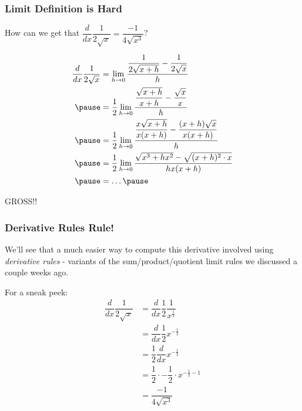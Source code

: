 \documentclass{ltx-talk}
\begin{document}
\begin{frame}
  \frametitle{Limit Definition is Hard}

  How can we get that $\dfrac{d}{dx} \dfrac{1}{2 \sqrt{x}} = \dfrac{-1}{4 \sqrt{x^3}}$? \pause

  \begin{align}
    \dfrac{d}{dx} \dfrac{1}{2\sqrt{x}} &= \lim\limits_{h \rightarrow 0} \dfrac{\dfrac{1}{2\sqrt{x + h}} - \dfrac{1}{2\sqrt{x}}}{h} \\ \pause
                                       &= \dfrac{1}{2}\lim\limits_{h \rightarrow 0} \dfrac{\dfrac{\sqrt{x + h}}{x + h} - \dfrac{\sqrt{x}}{x}}{h} \\ \pause
                                       &= \dfrac{1}{2} \lim\limits_{h \rightarrow 0} \dfrac{\dfrac{x\sqrt{x + h}}{x(x + h)} - \dfrac{(x + h)\sqrt{x}}{x(x + h)}}{h} \\ \pause
                                       &= \dfrac{1}{2} \lim\limits_{h \rightarrow 0} \dfrac{\sqrt{x^3 + hx^2} - \sqrt{(x + h)^2 \cdot x}}{h x (x + h)} \\ \pause
                                       &=  \ldots \pause
  \end{align}

  GROSS!!
\end{frame}

\begin{frame}
  \frametitle{Derivative Rules Rule!}

  We'll see that a much easier way to compute this derivative
  involved using \textit{derivative rules} - variants of the sum/product/quotient limit rules we discussed a couple weeks ago. \pause

  For a sneak peek: \pause
  \begin{align}
    \dfrac{d}{dx} \dfrac{1}{2\sqrt{x}} &= \dfrac{d}{dx} \dfrac{1}{2} \dfrac{1}{x^{\frac{1}{2}}} \\
                                       &= \dfrac{d}{dx} \dfrac{1}{2} x^{-\frac{1}{2}} \\
                                       &= \dfrac{1}{2} \dfrac{d}{dx} x^{-\frac{1}{2}} \\
                                       &= \dfrac{1}{2} \cdot -\dfrac{1}{2} \cdot x^{-\frac{1}{2} - 1} \\
                                       &= \dfrac{-1}{4\sqrt{x^3}}
  \end{align}
\end{frame}
\end{document}
